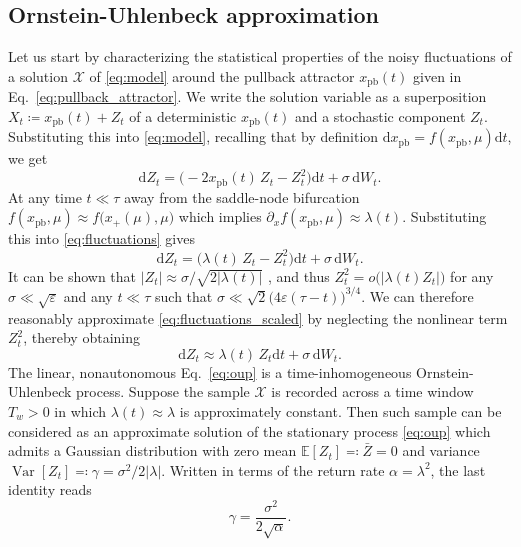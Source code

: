 \documentclass[openacc]{rsproca_new}
\newcommand{\dd}{\mathrm{d}}
\newcommand{\Var}{\operatorname{Var}}
\newcommand{\E}{\mathbb{E}}
\begin{document}
\subsection{Ornstein-Uhlenbeck approximation}\label{subsec:OUP}
Let us start by characterizing the statistical properties of the noisy fluctuations of a solution $\mathcal{X}$ of \eqref{eq:model} around the pullback attractor $x_{\mathrm{pb}}(t)$ given in Eq.~\eqref{eq:pullback_attractor}.
We write the solution variable as a superposition $X_t\coloneqq x_{\mathrm{pb}}(t)+Z_t$ of a deterministic $x_{\mathrm{pb}}(t)$ and a stochastic component $Z_t$.
Substituting this into \eqref{eq:model}, recalling that by definition $\dd x_{\mathrm{pb}}=f(x_{\mathrm{pb}},\mu)\dd t$, we get
%
\begin{equation}\label{eq:fluctuations}
  \dd Z_t=\bigl(-2 x_{\mathrm{pb}}(t)\,Z_t-Z_t^2\bigr)\dd t+\sigma\,\dd W_t .
\end{equation}
%
At any time $t\ll\tau$ away from the saddle-node bifurcation $f(x_{\mathrm{pb}},\mu)\approx f\bigl(x_+(\mu),\mu\bigr)$ which implies $\partial_x f(x_{\mathrm{pb}},\mu)\approx\lambda(t)$.
Substituting this into \eqref{eq:fluctuations} gives
%
\begin{equation}\label{eq:fluctuations_scaled}
        \dd Z_t=\bigl(\lambda(t)\,Z_t-Z_t^2\bigr)\dd t+\sigma\,\dd W_t .
\end{equation}
%
It can be shown that $|Z_t|\approx\sigma/\sqrt{2|\lambda(t)|}$ \cite[Thm.~$4.1$]{Kuehn2011}, and thus $Z_t^2=o\bigl(|\lambda(t)Z_t|\bigr)$ for any $\sigma\ll\sqrt{\varepsilon}$ and any $t\ll\tau$ such that $\sigma\ll\sqrt{2}\bigl(4\varepsilon(\tau-t)\bigr)^{3/4}$.
We can therefore reasonably approximate \eqref{eq:fluctuations_scaled} by neglecting the nonlinear term $Z_t^2$, thereby obtaining 
%
\begin{equation}\label{eq:oup}
        \dd Z_t\approx\lambda(t)\,Z_t\dd t+\sigma\,\dd W_t .
\end{equation}
%
The linear, nonautonomous Eq.~\eqref{eq:oup} is a time-inhomogeneous Ornstein-Uhlenbeck process.
Suppose the sample $\mathcal{X}$ is recorded across a time window $T_w>0$ in which $\lambda(t)\approx\lambda$ is approximately constant. 
Then such sample can be considered as an approximate solution of the stationary process \eqref{eq:oup} which admits a Gaussian distribution \cite[\S~$3.8$]{Gardiner2009} with zero mean $\E[Z_t]\eqqcolon\bar{Z}=0$ and variance $\Var[Z_t]\eqqcolon\gamma=\sigma^2/2|\lambda|$.
Written in terms of the return rate $\alpha=\lambda^2$, the last identity reads
%
\begin{equation}\label{eq:oup_variance}
        \gamma = \frac{\sigma^2}{2\sqrt{\alpha}} .
\end{equation}
\end{document}
